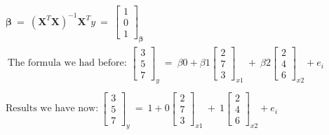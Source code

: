 \documentclass[10pt]{article}
\begin{document}
\begin{gather*}
\boldsymbol{\beta} \ =\ \left( \boldsymbol{X}^{T} \boldsymbol{X}\right)^{-1} \boldsymbol{X}^{T} y\ =\ \begin{bmatrix}
1\\
0\\
1
\end{bmatrix}_{\boldsymbol{\beta}}\\
\ \text{The formula we had before: }\begin{bmatrix}
3\\
5\\
7
\end{bmatrix}_{y} \ =\ \beta 0+\beta 1\begin{bmatrix}
2\\
7\\
3
\end{bmatrix}_{x1} \ +\ \beta 2\begin{bmatrix}
2\\
4\\
6
\end{bmatrix}_{x2} +e_{i}\\
\\
\text{Results we have now:} \ \begin{bmatrix}
3\\
5\\
7
\end{bmatrix}_{y} \ =\ 1+0\begin{bmatrix}
2\\
7\\
3
\end{bmatrix}_{x1} \ +\ 1\begin{bmatrix}
2\\
4\\
6
\end{bmatrix}_{x2} +e_{i}\\
\end{gather*}
\end{document}
